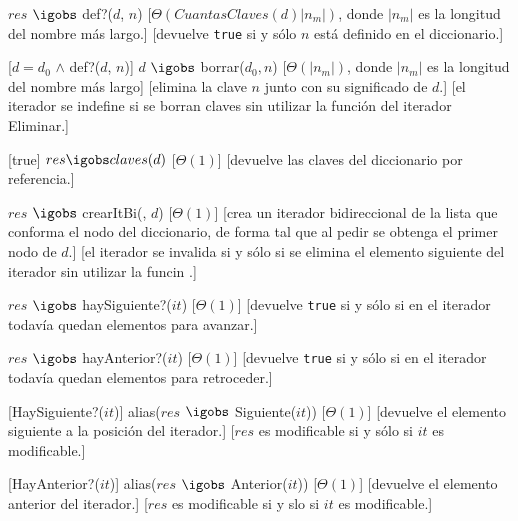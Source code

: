 \begin{Interfaz}
  {$res$ $\igobs$ def?($d$, $n$)}
  [$\Theta(CuantasClaves(d)|n_{m}|)$, donde $|n_{m}|$ es la longitud del nombre más largo.]
  [devuelve \texttt{true} si y sólo $n$ está definido en el diccionario.]

  [$d = d_0$ $\land$ def?($d$, $n$)]
  {$d$ $\igobs$ borrar($d_0, n$)}
  [$\Theta(|n_{m}|)$, donde $|n_{m}|$ es la longitud del nombre más largo]
  [elimina la clave $n$ junto con su significado de $d$.]
  [el iterador se indefine si se borran claves sin utilizar la función del iterador Eliminar.]

  [true]
  {$res \igobs claves(d)$}
  [$\Theta(1)$]
  [devuelve las claves del diccionario por referencia.]

  
  {$res$ $\igobs$ crearItBi(\secuencia{}, $d$)}
  [$\Theta(1)$]
  [crea un iterador bidireccional de la lista que conforma el nodo del diccionario, de forma tal que al pedir  se obtenga el primer nodo de $d$.]
  [el iterador se invalida si y sólo si se elimina el elemento siguiente del iterador sin utilizar la funcin .]
  
  {$res$ $\igobs$ haySiguiente?($it$)}
  [$\Theta(1)$]
  [devuelve \texttt{true} si y sólo si en el iterador todavía quedan elementos para avanzar.]

  {$res$ $\igobs$ hayAnterior?($it$)}
  [$\Theta(1)$]
  [devuelve \texttt{true} si y sólo si en el iterador todavía quedan elementos para retroceder.]

  [HaySiguiente?($it$)]
  {alias($res$ $\igobs$ Siguiente($it$))}
  [$\Theta(1)$]
  [devuelve el elemento siguiente a la posición del iterador.]
  [$res$ es modificable si y sólo si $it$ es modificable.]

  [HayAnterior?($it$)]
  {alias($res$ $\igobs$ Anterior($it$))}
  [$\Theta(1)$]
  [devuelve el elemento anterior del iterador.]
  [$res$ es modificable si y slo si $it$ es modificable.]


\end{Interfaz}
